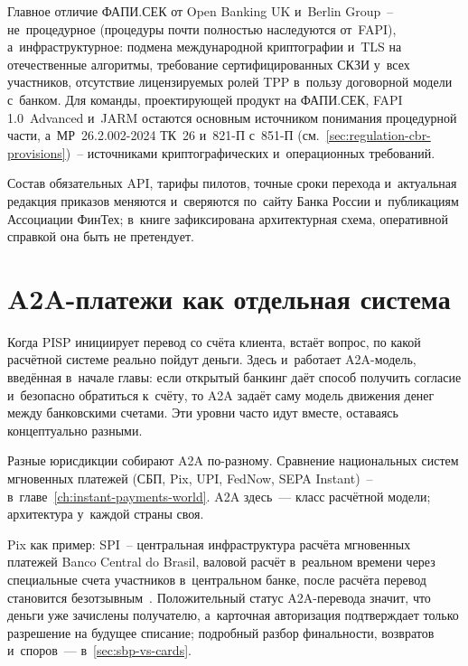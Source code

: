 Главное отличие ФАПИ.СЕК от Open Banking UK и~Berlin Group~--
не~процедурное (процедуры почти полностью наследуются от~FAPI),
а~инфраструктурное: подмена международной криптографии и~TLS
на отечественные алгоритмы, требование сертифицированных СКЗИ
у~всех участников, отсутствие лицензируемых ролей TPP в~пользу
договорной модели с~банком. Для команды, проектирующей продукт
на ФАПИ.СЕК, FAPI 1.0~Advanced и~JARM остаются основным источником
понимания процедурной части, а~МР~26.2.002-2024 ТК~26 и~821-П
с~851-П (см.~\ref{sec:regulation-cbr-provisions})~-- источниками
криптографических и~операционных требований.

Состав обязательных API, тарифы пилотов, точные сроки перехода
и~актуальная редакция приказов меняются и~сверяются по~сайту Банка
России и~публикациям Ассоциации ФинТех; в~книге зафиксирована
архитектурная схема, оперативной справкой она быть не претендует.

\section{A2A-платежи как отдельная система}\label{sec:a2a-payments}

Когда PISP инициирует перевод со счёта клиента, встаёт вопрос,
по какой расчётной системе реально пойдут деньги. Здесь и~работает
A2A-модель, введённая в~начале главы: если открытый банкинг даёт способ
получить согласие и~безопасно обратиться к~счёту, то A2A задаёт саму
модель движения денег между банковскими счетами. Эти уровни часто идут
вместе, оставаясь концептуально разными.

Разные юрисдикции собирают A2A по-разному. Сравнение национальных
систем мгновенных платежей (СБП, Pix, UPI, FedNow, SEPA Instant)~--
в~главе~\ref{ch:instant-payments-world}. A2A здесь~--- класс
расчётной модели; архитектура у~каждой страны своя.

Pix как пример: SPI~-- центральная инфраструктура расчёта мгновенных
платежей Banco Central do Brasil, валовой расчёт в~реальном времени
через специальные счета участников в~центральном банке, после расчёта
перевод становится безотзывным~\cite{pix-spi}. Положительный статус
A2A-перевода значит, что деньги уже зачислены получателю, а~карточная
авторизация подтверждает только разрешение на будущее списание;
подробный разбор финальности, возвратов и~споров~---
в~\ref{sec:sbp-vs-cards}.

